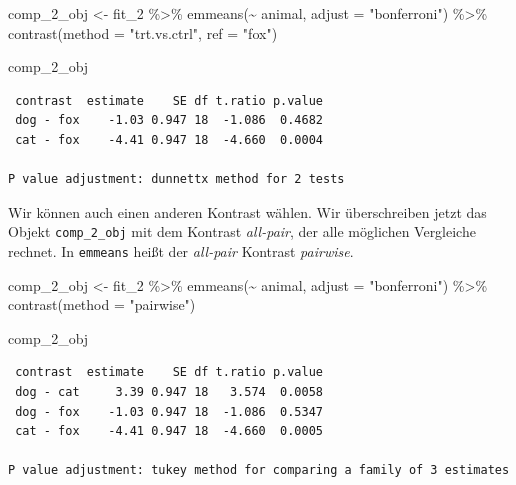 \documentclass[
  letterpaper,
]{scrbook}
\newenvironment{Shaded}{\begin{snugshade}}{\end{snugshade}}
\newcommand{\AttributeTok}[1]{\textcolor[rgb]{0.40,0.45,0.13}{#1}}
\newcommand{\FunctionTok}[1]{\textcolor[rgb]{0.28,0.35,0.67}{#1}}
\newcommand{\NormalTok}[1]{\textcolor[rgb]{0.00,0.23,0.31}{#1}}
\newcommand{\OtherTok}[1]{\textcolor[rgb]{0.00,0.23,0.31}{#1}}
\newcommand{\SpecialCharTok}[1]{\textcolor[rgb]{0.37,0.37,0.37}{#1}}
\newcommand{\StringTok}[1]{\textcolor[rgb]{0.13,0.47,0.30}{#1}}
\begin{document}
\begin{Shaded}
\begin{Highlighting}[]
\NormalTok{comp\_2\_obj }\OtherTok{\textless{}{-}}\NormalTok{ fit\_2 }\SpecialCharTok{\%\textgreater{}\%} 
  \FunctionTok{emmeans}\NormalTok{(}\SpecialCharTok{\textasciitilde{}}\NormalTok{ animal, }\AttributeTok{adjust =} \StringTok{"bonferroni"}\NormalTok{) }\SpecialCharTok{\%\textgreater{}\%} 
  \FunctionTok{contrast}\NormalTok{(}\AttributeTok{method =} \StringTok{"trt.vs.ctrl"}\NormalTok{, }\AttributeTok{ref =} \StringTok{"fox"}\NormalTok{) }

\NormalTok{comp\_2\_obj}
\end{Highlighting}
\end{Shaded}

\begin{verbatim}
 contrast  estimate    SE df t.ratio p.value
 dog - fox    -1.03 0.947 18  -1.086  0.4682
 cat - fox    -4.41 0.947 18  -4.660  0.0004

P value adjustment: dunnettx method for 2 tests 
\end{verbatim}

Wir können auch einen anderen Kontrast wählen. Wir überschreiben jetzt
das Objekt \texttt{comp\_2\_obj} mit dem Kontrast \emph{all-pair}, der
alle möglichen Vergleiche rechnet. In \texttt{emmeans} heißt der
\emph{all-pair} Kontrast \emph{pairwise}.

\begin{Shaded}
\begin{Highlighting}[]
\NormalTok{comp\_2\_obj }\OtherTok{\textless{}{-}}\NormalTok{ fit\_2 }\SpecialCharTok{\%\textgreater{}\%} 
  \FunctionTok{emmeans}\NormalTok{(}\SpecialCharTok{\textasciitilde{}}\NormalTok{ animal, }\AttributeTok{adjust =} \StringTok{"bonferroni"}\NormalTok{) }\SpecialCharTok{\%\textgreater{}\%} 
  \FunctionTok{contrast}\NormalTok{(}\AttributeTok{method =} \StringTok{"pairwise"}\NormalTok{) }

\NormalTok{comp\_2\_obj}
\end{Highlighting}
\end{Shaded}

\begin{verbatim}
 contrast  estimate    SE df t.ratio p.value
 dog - cat     3.39 0.947 18   3.574  0.0058
 dog - fox    -1.03 0.947 18  -1.086  0.5347
 cat - fox    -4.41 0.947 18  -4.660  0.0005

P value adjustment: tukey method for comparing a family of 3 estimates 
\end{verbatim}
\end{document}
